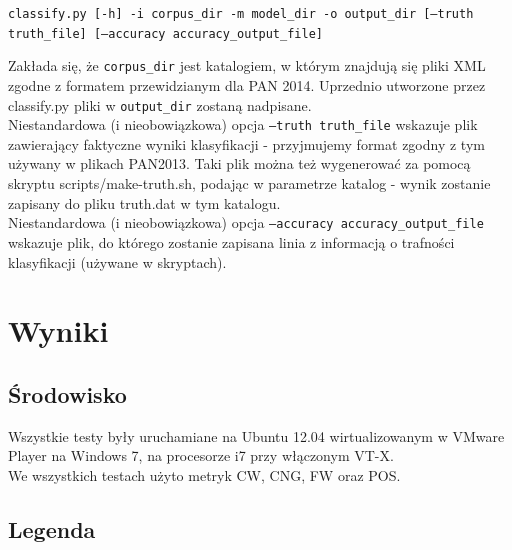 \documentclass{article}
\begin{document}
\texttt{classify.py [-h] -i corpus\_dir -m model\_dir -o output\_dir  [--truth truth\_file] [--accuracy accuracy\_output\_file]}

Zakłada się, że \texttt{corpus\_dir} jest katalogiem, w którym znajdują się pliki XML zgodne z formatem przewidzianym dla PAN 2014. Uprzednio utworzone przez classify.py pliki w \texttt{output\_dir} zostaną nadpisane. \\
Niestandardowa (i nieobowiązkowa) opcja \texttt{--truth truth\_file} wskazuje plik zawierający faktyczne wyniki klasyfikacji - przyjmujemy format zgodny z tym używany w plikach PAN2013. Taki plik można też wygenerować za pomocą skryptu scripts/make-truth.sh, podając w parametrze katalog - wynik zostanie zapisany do pliku truth.dat w tym katalogu.\\
Niestandardowa (i nieobowiązkowa) opcja \texttt{--accuracy accuracy\_output\_file} wskazuje plik, do którego zostanie zapisana linia z informacją o trafności klasyfikacji (używane w skryptach).


\section{Wyniki}

\subsection{Środowisko}

Wszystkie testy były uruchamiane na Ubuntu 12.04 wirtualizowanym w VMware Player na Windows 7, na procesorze i7 przy włączonym VT-X. \\

We wszystkich testach użyto metryk CW, CNG, FW oraz POS. \\

\subsection{Legenda}
\end{document}
